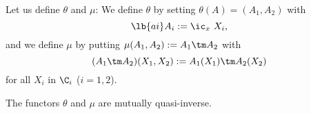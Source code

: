 \documentclass[12pt]{article}
\theoremstyle{remark}
\theoremstyle{definition}
\begin{document}
Let us define $\theta$ and $\mu$: We define $\theta$ by setting $\theta(A)=(A_1,A_2)$ with
\begin{equation}\lb{ai}
A_i:=\ic_x\ X_i, 
\end{equation} 
and we define $\mu$ by putting $\mu(A_1,A_2):=A_1\tm A_2$ with 
$$
(A_1\tm A_2)(X_1,X_2):=A_1(X_1)\tm A_2(X_2)
$$ 
for all $X_i$ in $\C_i$ ($i=1,2$).%

\begin{prop}[Proposition 6.1.12 p.~134]
The functors $\theta$ and $\mu$ are mutually quasi-inverse.
\end{prop}
\end{document}
